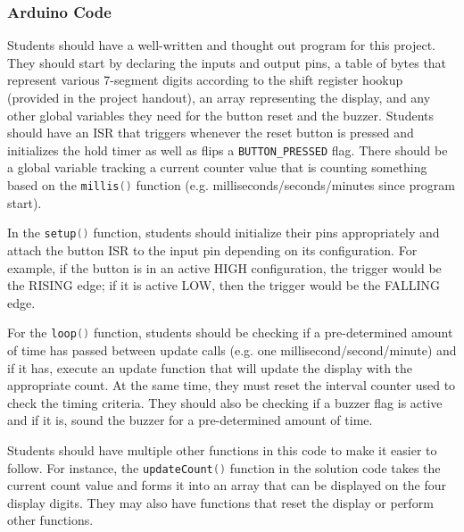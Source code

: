 \documentclass{article}
\begin{document}
        \subsubsection*{Arduino Code}
        Students should have a well-written and thought out program for this project.
        They should start by declaring the inputs and output pins, a table of bytes that represent various 7-segment digits according to the shift register hookup (provided in the project handout), an array representing the display, and any other global variables they need for the button reset and the buzzer.
        Students should have an ISR that triggers whenever the reset button is pressed and initializes the hold timer as well as flips a \lstinline[language=C++, style=mystyle]{BUTTON_PRESSED} flag.
        There should be a global variable tracking a current counter value that is counting something based on the \lstinline[language=C++, style=mystyle]{millis()} function (e.g. milliseconds/seconds/minutes since program start).

        In the \lstinline[language=C++, style=mystyle]{setup()} function, students should initialize their pins appropriately and attach the button ISR to the input pin depending on its configuration.
        For example, if the button is in an active HIGH configuration, the trigger would be the RISING edge; if it is active LOW, then the trigger would be the FALLING edge.

        For the \lstinline[language=C++, style=mystyle]{loop()} function, students should be checking if a pre-determined amount of time has passed between update calls (e.g. one millisecond/second/minute) and if it has, execute an update function that will update the display with the appropriate count.
        At the same time, they must reset the interval counter used to check the timing criteria.
        They should also be checking if a buzzer flag is active and if it is, sound the buzzer for a pre-determined amount of time.

        Students should have multiple other functions in this code to make it easier to follow. 
        For instance, the \lstinline[language=C++, style=mystyle]{updateCount()} function in the solution code takes the current count value and forms it into an array that can be displayed on the four display digits. They may also have functions that reset the display or perform other functions.

        \pagebreak
        
\end{document}
